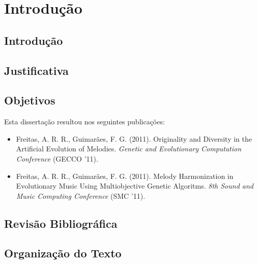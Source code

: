 \chapter{Introdução}
\label{chap:Intro}

\section{Introdução}


\section{Justificativa}



\section{Objetivos} 



Esta dissertação resultou nos seguintes publicações:

\begin{itemize}
\item Freitas, A. R. R., Guimarães, F. G. (2011). Originality and Diversity in the Artificial Evolution of Melodies. \textit{Genetic and Evolutionary Computation Conference} (GECCO '11).
\item Freitas, A. R. R., Guimarães, F. G. (2011). Melody Harmonization in Evolutionary Music Using Multiobjective Genetic Algoritms. \textit{8th Sound and Music Computing Conference} (SMC '11).
\end{itemize}


\section{Revisão Bibliográfica}



\section{Organização do Texto}
